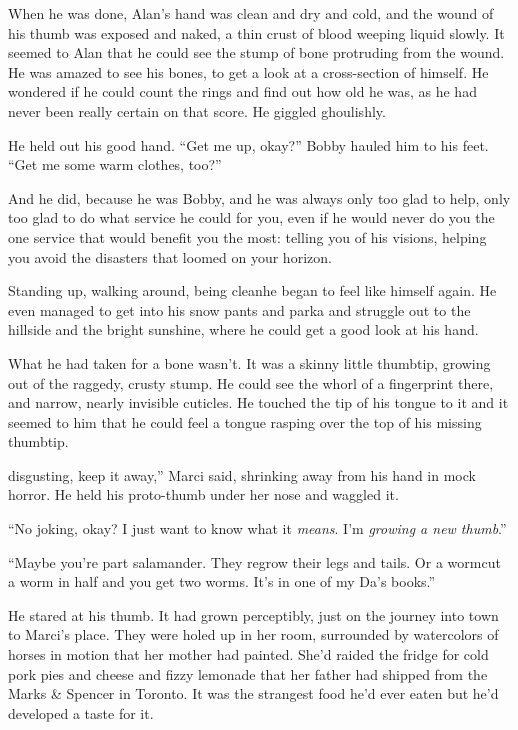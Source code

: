 When he was done, Alan's hand was clean and dry and cold, and the
wound of his thumb was exposed and naked, a thin crust of blood
weeping liquid slowly.  It seemed to Alan that he could see the stump
of bone protruding from the wound.  He was amazed to see his bones, to
get a look at a cross-section of himself.  He wondered if he could
count the rings and find out how old he was, as he had never been
really certain on that score.  He giggled ghoulishly.

He held out his good hand.  ``Get me up, okay?'' Bobby hauled him to
his feet.  ``Get me some warm clothes, too?''

And he did, because he was Bobby, and he was always only too glad to
help, only too glad to do what service he could for you, even if he
would never do you the one service that would benefit you the most: 
telling you of his visions, helping you avoid the disasters that
loomed on your horizon.

Standing up, walking around, being clean\dash{}he began to feel like
himself again.  He even managed to get into his snow pants and parka
and struggle out to the hillside and the bright sunshine, where he
could get a good look at his hand.

What he had taken for a bone wasn't.  It was a skinny little thumbtip,
growing out of the raggedy, crusty stump.  He could see the whorl of a
fingerprint there, and narrow, nearly invisible cuticles.  He touched
the tip of his tongue to it and it seemed to him that he could feel a
tongue rasping over the top of his missing thumbtip.

 disgusting, keep it away,'' Marci said, shrinking away from his
hand in mock horror.  He held his proto-thumb under her nose and
waggled it.

``No joking, okay?  I just want to know what it \textit{means}.  I'm
\textit{growing a new thumb}.''

``Maybe you're part salamander.  They regrow their legs and tails.  Or
a worm\dash{}cut a worm in half and you get two worms.  It's in one of my
Da's books.''

He stared at his thumb.  It had grown perceptibly, just on the journey
into town to Marci's place.  They were holed up in her room,
surrounded by watercolors of horses in motion that her mother had
painted.  She'd raided the fridge for cold pork pies and cheese and
fizzy lemonade that her father had shipped from the Marks \&
Spencer in Toronto.  It was the strangest food he'd ever eaten but
he'd developed a taste for it.

